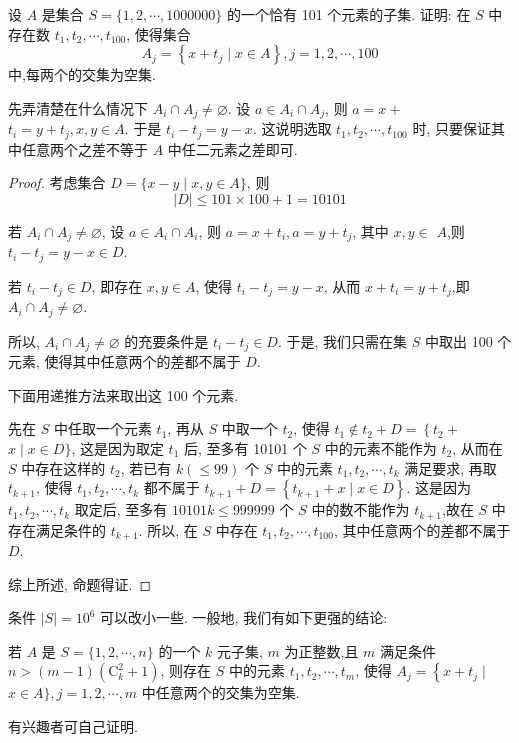 \begin{example}
	设 $A$ 是集合 $S=\{1,2, \cdots, 1000000\}$ 的一个恰有 101 个元素的子集. 证明: 在 $S$ 中存在数 $t_{1}, t_{2}, \cdots, t_{100}$, 使得集合
	$$
		A_{j}=\left\{x+t_{j} \mid x \in A\right\}, j=1,2, \cdots, 100
	$$
	中,每两个的交集为空集.
\end{example}
\begin{analysis}
	先弄清楚在什么情况下 $A_{i} \cap A_{j} \neq \varnothing$. 设 $a \in A_{i} \cap A_{j}$, 则 $a=x+$ $t_{i}=y+t_{j}, x, y \in A$. 于是 $t_{i}-t_{j}=y-x$. 这说明选取 $t_{1}, t_{2}, \cdots, t_{100}$ 时, 只要保证其中任意两个之差不等于 $A$ 中任二元素之差即可.
\end{analysis}

\begin{proof}
	考虑集合 $D=\{x-y \mid x, y \in A\}$, 则
	$$
		|D| \leqslant 101 \times 100+1=10101
	$$

	若 $A_{i} \cap A_{j} \neq \varnothing$, 设 $a \in A_{i} \cap A_{i}$, 则 $a=x+t_{i}, a=y+t_{j}$, 其中 $x, y \in$ $A$,则 $t_{i}-t_{j}=y-x \in D$.

	若 $t_{i}-t_{j} \in D$, 即存在 $x, y \in A$, 使得 $t_{i}-t_{j}=y-x$, 从而 $x+t_{i}=y+t_{j}$,即 $A_{i} \cap A_{j} \neq \varnothing$.

	所以, $A_{i} \cap A_{j} \neq \varnothing$ 的充要条件是 $t_{i}-t_{j} \in D$. 于是, 我们只需在集 $S$ 中取出 100 个元素, 使得其中任意两个的差都不属于 $D$.

	下面用递推方法来取出这 100 个元素.

	先在 $S$ 中任取一个元素 $t_{1}$, 再从 $S$ 中取一个 $t_{2}$, 使得 $t_{1} \notin t_{2}+D=\left\{t_{2}+\right.$ $x \mid x \in D\}$, 这是因为取定 $t_{1}$ 后, 至多有 10101 个 $S$ 中的元素不能作为 $t_{2}$, 从而在 $S$ 中存在这样的 $t_{2}$, 若已有 $k(\leqslant 99)$ 个 $S$ 中的元素 $t_{1}, t_{2}, \cdots, t_{k}$ 满足要求, 再取 $t_{k+1}$, 使得 $t_{1}, t_{2}, \cdots, t_{k}$ 都不属于 $t_{k+1}+D=\left\{t_{k+1}+x \mid x \in D\right\}$. 这是因为 $t_{1}, t_{2}, \cdots, t_{k}$ 取定后, 至多有 $10101 k \leqslant 999999$ 个 $S$ 中的数不能作为 $t_{k+1}$,故在 $S$ 中存在满足条件的 $t_{k+1}$. 所以, 在 $S$ 中存在 $t_{1}, t_{2}, \cdots, t_{100}$, 其中任意两个的差都不属于 $D$.

	综上所述, 命题得证.
\end{proof}

\begin{note}
	条件 $|S|=10^{6}$ 可以改小一些. 一般地, 我们有如下更强的结论:

	若 $A$ 是 $S=\{1,2, \cdots, n\}$ 的一个 $k$ 元子集, $m$ 为正整数,且 $m$ 满足条件 $n>(m-1)\left(\mathrm{C}_{k}^{2}+1\right)$, 则存在 $S$ 中的元素 $t_{1}, t_{2}, \cdots, t_{m}$, 使得 $A_{j}=\left\{x+t_{j} \mid\right.$ $x \in A\}, j=1,2, \cdots, m$ 中任意两个的交集为空集.

	有兴趣者可自己证明.
\end{note}

